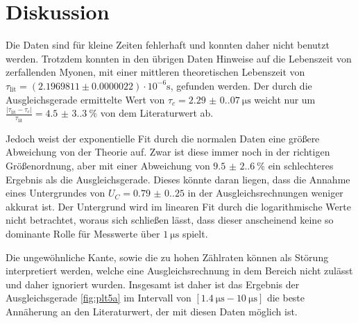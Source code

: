 \section{Diskussion}
Die Daten sind für kleine Zeiten fehlerhaft und konnten daher nicht benutzt werden. 
Trotzdem konnten in den übrigen Daten Hinweise auf die Lebenszeit von zerfallenden Myonen, 
mit einer mittleren theoretischen Lebenszeit von $\tau_\text{lit} = (2.1969811 \pm0.0000022)\cdot 10^{-6}\unit{\s}$\cite{Workman:2022ynf}, gefunden werden. 
Der durch die Ausgleichsgerade ermittelte Wert von $\tau_c= \qty{2.29(0.07)}{\us}$ weicht nur um 
$\frac{|\tau_\text{lit} - \tau_c|}{\tau_\text{lit}} = \qty{4.5(3.3)}{\percent}$ von dem Literaturwert ab. 

Jedoch weist der exponentielle Fit durch die normalen Daten eine größere Abweichung von der Theorie auf. 
Zwar ist diese immer noch in der richtigen Größenordnung, aber mit einer Abweichung von $\qty{9.5(2.6)}{\percent}$ ein schlechteres Ergebnis als die Ausgleichsgerade.
Dieses könnte daran liegen, dass die Annahme eines Untergrundes von $U_C=\num{0.79(0.25)}$ in der Ausgleichsrechnungen weniger akkurat ist.
Der Untergrund wird im linearen Fit durch die logarithmische Werte nicht betrachtet, woraus sich schließen lässt, 
dass dieser anscheinend keine so dominante Rolle für Messwerte über $\qty{1}{\us} $ spielt. 

Die ungewöhnliche Kante, sowie die zu hohen Zählraten können als Störung interpretiert werden, 
welche eine Ausgleichsrechnung in dem Bereich nicht zulässt und daher ignoriert wurden. 
Insgesamt ist daher ist das Ergebnis der Ausgleichsgerade \eqref{fig:plt5a} im Intervall von $[\qty{1.4}{\us}-\qty{10}{\us}]$ die beste Annäherung an den Literaturwert, 
der mit diesen Daten möglich ist. 

\newpage
\printbibliography

